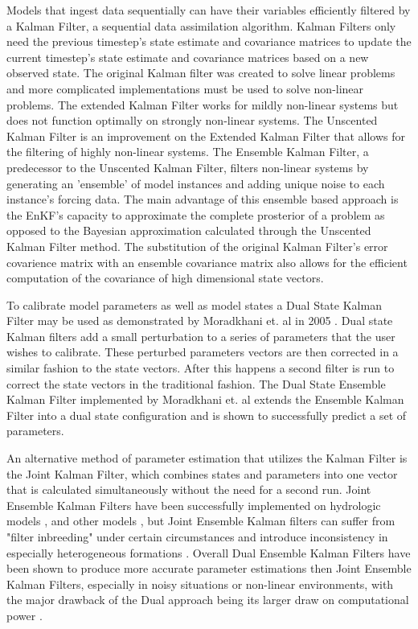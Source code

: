 	Models that ingest data sequentially can have their variables efficiently filtered by a Kalman Filter, a sequential data assimilation algorithm. Kalman Filters only need the previous timestep's state estimate and covariance matrices to update the current timestep's state estimate and covariance matrices based on a new observed state. The original Kalman filter\cite{Kalman1960} was created to solve linear problems and more complicated implementations must be used to solve non-linear problems. The extended Kalman Filter\cite{Jazwinski1970} works for mildly non-linear systems but does not function optimally on strongly non-linear systems\cite{Miller1994}. The Unscented Kalman Filter\cite{Julier1997} is an improvement on the Extended Kalman Filter that allows for the filtering of highly non-linear systems. The Ensemble Kalman Filter\cite{Evensen1994}, a predecessor to the Unscented Kalman Filter, filters non-linear systems by generating an 'ensemble' of model instances and adding unique noise to each instance's forcing data. The main advantage of this ensemble based approach is the EnKF's capacity to approximate the complete prosterior of a problem as opposed to the Bayesian approximation calculated through the Unscented Kalman Filter method.  The substitution of the original Kalman Filter's error covarience matrix with an ensemble covariance matrix also allows for the efficient computation of the covariance of high dimensional state vectors.
	
	To calibrate model parameters as well as model states a Dual State Kalman Filter may be used as demonstrated by Moradkhani et. al in 2005 \cite{Moradkhani2005}. Dual state Kalman filters add a small perturbation to a series of parameters that the user wishes to calibrate. These perturbed parameters vectors are then corrected in a similar fashion to the state vectors. After this happens a second filter is run to correct the state vectors in the traditional fashion. The Dual State Ensemble Kalman Filter implemented by Moradkhani et. al\cite{Moradkhani2005} extends the Ensemble Kalman Filter into a dual state configuration and is shown to successfully predict a set of parameters.
	
	An alternative method of parameter estimation that utilizes the Kalman Filter is the Joint Kalman Filter, which combines states and parameters into one vector that is calculated simultaneously without the need for a second run. Joint Ensemble Kalman Filters have been successfully implemented on hydrologic models \cite{Vrugt2005}, \cite{Xiong2019} and other models \cite{Chen2008}, but Joint Ensemble Kalman filters can suffer from "filter inbreeding" under certain circumstances \cite{HendricksFranssen2008} and introduce inconsistency in especially heterogeneous formations \cite{Wen2006}. Overall Dual Ensemble Kalman Filters have been shown to produce more accurate parameter estimations then Joint Ensemble Kalman Filters, especially in noisy situations or non-linear environments, with the major drawback of the Dual approach being its larger draw on computational power \cite{Mariani2005}.
	
